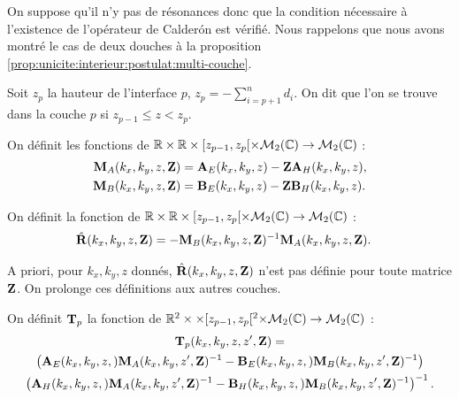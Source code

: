     On suppose qu'il n'y pas de résonances donc que la condition nécessaire à l'existence de l'opérateur de Calderón est vérifié.
    Nous rappelons que nous avons montré le cas de deux douches à la proposition \ref{prop:unicite:interieur:postulat:multi-couche}.

    Soit \(z_p\) la hauteur de l'interface \(p\), \(z_p = -\sum_{i=p+1}^{n} d_{i}\). On dit que l'on se trouve dans la couche \(p\) si \(z_{p-1} \le z < z_p \).

    \begin{defn}
      \label{def:plan:matrices_MA-MB}
      On définit les fonctions de \(\mathbb R\times\mathbb R\times [z_{p-1}, z_p[ \times \mathcal{M}_{2}(\mathbb C) \rightarrow \mathcal{M}_{2}(\mathbb C)\) :
      \begin{align*}
        \mathbf{M}_{A}(k_x,k_y,z,\mathbf{Z}) &= \mathbf{A}_{E}(k_x,k_y,z)-\mathbf{Z}\mathbf{A}_{H}(k_x,k_y,z),
        \\
        \mathbf{M}_{B}(k_x,k_y,z,\mathbf{Z}) &= \mathbf{B}_{E}(k_x,k_y,z)-\mathbf{Z}\mathbf{B}_{H}(k_x,k_y,z).
      \end{align*}
    \end{defn}

    \begin{defn}
      \label{def:plan:reflexion:impedance}
      On définit la fonction de \(\mathbb R\times\mathbb R\times [z_{p-1}, z_p[ \times \mathcal{M}_{2}(\mathbb C) \rightarrow \mathcal{M}_{2}(\mathbb C)\) :
      \begin{align*}
        \hat{\mathbf{R}}(k_x,k_y,z,\mathbf{Z}) &= -\mathbf{M}_{B}(k_x,k_y,z,\mathbf{Z})^{-1}\mathbf{M}_{A}(k_x,k_y,z,\mathbf{Z}).
      \end{align*}
    \end{defn}
    A priori, pour \(k_x,k_y,z\) donnés, \(\hat{\mathbf{R}}(k_x,k_y,z,\mathbf{Z})\) n'est pas définie pour toute matrice \(\mathbf{Z}\).
    On prolonge ces définitions aux autres couches.

    \begin{defn}%
      \label{def:plan:transfert:impedance}

      On définit \(\mathbf{T}_p\) la fonction de \(\mathbb R^2\times\times [z_{p-1}, z_p[^2\times\mathcal{M}_2(\mathbb C)\rightarrow \mathcal{M}_{2}(\mathbb C)\) :
      \begin{multline*}
        \mathbf{T}_p(k_x,k_y,z,z',\mathbf{Z}) = \\
          \left(\mathbf{A}_{E}(k_x,k_y,z,)\mathbf{M}_{A}(k_x,k_y,z',\mathbf{Z})^{-1} - \mathbf{B}_{E}(k_x,k_y,z,)\mathbf{M}_{B}(k_x,k_y,z',\mathbf{Z})^{-1}\right) 
          \\
          \left(\mathbf{A}_{H}(k_x,k_y,z,)\mathbf{M}_{A}(k_x,k_y,z',\mathbf{Z})^{-1} - \mathbf{B}_{H}(k_x,k_y,z,)\mathbf{M}_{B}(k_x,k_y,z',\mathbf{Z})^{-1}\right)^{-1}.
      \end{multline*}
    \end{defn}

